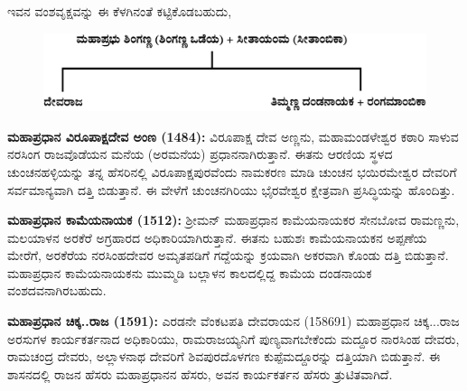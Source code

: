 \newpage

ಇವನ ವಂಶವೃಕ್ಷವನ್ನು ಈ ಕೆಳಗಿನಂತೆ ಕಟ್ಟಿಕೊಡಬಹುದು,

\begin{figure}[H]
\includegraphics[scale=1.2]{images/chap3/chap3fig38.jpeg}
\end{figure}

\vskip -3pt

\textbf{ಮಹಾಪ್ರಧಾನ ವಿರೂಪಾಕ್ಷದೇವ ಅಂಣ (1484):} ವಿರೂಪಾಕ್ಷ ದೇವ ಅಣ್ಣನು, ಮಹಾಮಂಡಳೇಶ್ವರ ಕಠಾರಿ ಸಾಳುವ ನರಸಿಂಗ ರಾಜವೊಡೆಯನ ಮನೆಯ (ಅರಮನೆಯ) ಪ್ರಧಾನನಾಗಿರುತ್ತಾನೆ. ಈತನು ಆರಣಿಯ ಸ್ಥಳದ ಚುಂಚನಹಳ್ಳಿಯನ್ನು ತನ್ನ ಹೆಸರಿನಲ್ಲಿ ವಿರೂಪಾಕ್ಷಪುರವೆಂದು ನಾಮಕರಣ ಮಾಡಿ ಚುಂಚನ ಭಯಿರಮೇಶ್ವರ ದೇವರಿಗೆ ಸರ್ವಮಾನ್ಯವಾಗಿ ದತ್ತಿ ಬಿಡುತ್ತಾನೆ. ಈ ವೇಳೆಗೆ ಚುಂಚನಗಿರಿಯು ಭೈರವೇಶ್ವರ ಕ್ಷೇತ್ರವಾಗಿ ಪ್ರಸಿದ್ಧಿಯನ್ನು ಹೊಂದಿತ್ತು.

\vskip -1pt

\textbf{ಮಹಾಪ್ರಧಾನ ಕಾಮೆಯನಾಯಕ (1512):} ಶ‍್ರೀಮನ್​ ಮಹಾಪ್ರಧಾನ ಕಾಮೆಯನಾಯಕರ ಸೇನಬೋವ ರಾಮಣ್ಣನು, ಮಲಯಾಳನ ಅರಕೆರೆ ಅಗ್ರಹಾರದ ಅಧಿಕಾರಿಯಾಗಿರುತ್ತಾನೆ. ಈತನು ಬಹುಶಃ ಕಾಮೆಯನಾಯಕನ ಅಪ್ಪಣೆಯ ಮೇರೆಗೆ, ಅರಕೆರೆಯ ನರಸಿಂಹದೇವರ ಅಮೃತಪಡಿಗೆ ಗದ್ದೆಯನ್ನು ಕ್ರಯವಾಗಿ ಅಕರವಾಗಿ ಕೊಂಡು ದತ್ತಿ ಬಿಡುತ್ತಾನೆ. ಮಹಾಪ್ರಧಾನ ಕಾಮೆಯನಾಯಕನು ಮುಮ್ಮಡಿ ಬಲ್ಲಾಳನ ಕಾಲದಲ್ಲಿದ್ದ ಕಾಮೆಯ ದಂಡನಾಯಕ ವಂಶದವನಾಗಿರಬಹುದು.

\vskip -1pt

\textbf{ಮಹಾಪ್ರಧಾನ ಚಿಕ್ಕ..ರಾಜ (1591):} ಎರಡನೇ ವೆಂಕಟಪತಿ ದೇವರಾಯನ (1586\enginline{-}91) ಮಹಾಪ್ರಧಾನ ಚಿಕ್ಕ...ರಾಜ ಅರಸುಗಳ ಕಾರ್ಯಕರ್ತನಾದ ಅಧಿಕಾರಿಯು, ರಾಮರಾಜಯ್ಯನಿಗೆ ಪುಣ್ಯವಾಗಬೇಕೆಂದು ಮದ್ದೂರ ನಾರಸಿಂಹ ದೇವರು, ರಾಮಚಂದ್ರ ದೇವರು, ಅಲ್ಲಾಳನಾಥ ದೇವರಿಗೆ ಶಿವಪುರದೊಳಗಣ ಕುಪ್ಪೆಮದ್ದೂರನ್ನು ದತ್ತಿಯಾಗಿ ಬಿಡುತ್ತಾನೆ. ಈ ಶಾಸನದಲ್ಲಿ ರಾಜನ ಹೆಸರು ಮಹಾಪ್ರಧಾನನ ಹೆಸರು, ಅವನ ಕಾರ್ಯಕರ್ತನ ಹೆಸರು ತ್ರುಟಿತವಾಗಿದೆ.

\vskip -1pt

